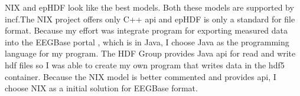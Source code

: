 \begin{table}[h]
	\caption{The current formats comparison.} 
\label{format_comparsion1}	
\end{table}

NIX and epHDF look like the best models. Both these models are supported by \gls{incf}.The NIX project offers only C++ \gls{api} and epHDF is only a standard for file format. Because my effort was integrate program for exporting measured data into the EEGBase portal \cite{eegportal}, which is in Java, I choose Java as the programming language for my program. The HDF Group provides Java \gls{api} for read and write \gls{hdf} files so I was able to create my own program that writes data in the \gls{hdf5} container. Because the NIX model is better commented and provides \gls{api}, I choose NIX as a initial solution for EEGBase format.

